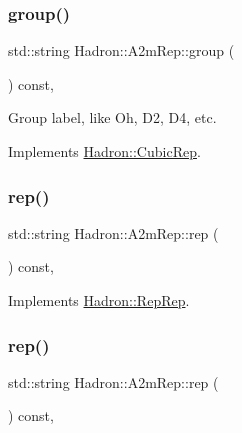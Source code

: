 \subsubsection{\texorpdfstring{group()}{group()}\hspace{0.1cm}{\footnotesize\ttfamily [3/3]}}
{\footnotesize\ttfamily std\+::string Hadron\+::\+A2m\+Rep\+::group (\begin{DoxyParamCaption}{ }\end{DoxyParamCaption}) const\hspace{0.3cm}{\ttfamily [inline]}, {\ttfamily [virtual]}}

Group label, like Oh, D2, D4, etc. 

Implements \mbox{\hyperlink{structHadron_1_1CubicRep_a0748f11ec87f387062c8e8981339a29c}{Hadron\+::\+Cubic\+Rep}}.

\mbox{\label{structHadron_1_1A2mRep_a1450e109b5a5fcb9a2098c67305fb5af}} 
\subsubsection{\texorpdfstring{rep()}{rep()}\hspace{0.1cm}{\footnotesize\ttfamily [1/5]}}
{\footnotesize\ttfamily std\+::string Hadron\+::\+A2m\+Rep\+::rep (\begin{DoxyParamCaption}{ }\end{DoxyParamCaption}) const\hspace{0.3cm}{\ttfamily [inline]}, {\ttfamily [virtual]}}



Implements \mbox{\hyperlink{structHadron_1_1RepRep_ab3213025f6de249f7095892109575fde}{Hadron\+::\+Rep\+Rep}}.

\mbox{\label{structHadron_1_1A2mRep_a1450e109b5a5fcb9a2098c67305fb5af}} 
\subsubsection{\texorpdfstring{rep()}{rep()}\hspace{0.1cm}{\footnotesize\ttfamily [2/5]}}
{\footnotesize\ttfamily std\+::string Hadron\+::\+A2m\+Rep\+::rep (\begin{DoxyParamCaption}{ }\end{DoxyParamCaption}) const\hspace{0.3cm}{\ttfamily [inline]}, {\ttfamily [virtual]}}



